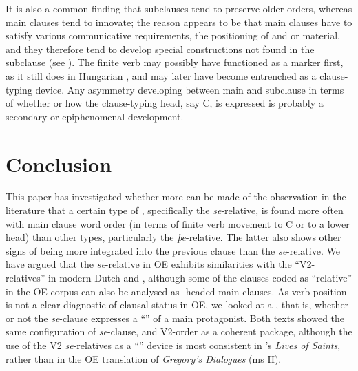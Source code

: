 \documentclass[output=paper,colorlinks,citecolor=brown]{langscibook}
\begin{document}
It is also a common finding that subclauses tend to preserve older orders, whereas main clauses tend to innovate; the reason appears to be that main clauses have to satisfy various communicative requirements, the positioning of  and  or  material, and they therefore tend to develop special constructions not found in the subclause (see \citealt{Bybee2001}). The finite verb may possibly have functioned as a  marker first, as it still does in Hungarian \citep[63]{Comrie1997}, and may later have become entrenched as a clause-typing device. Any asymmetry developing between main and subclause in terms of whether or how the clause-typing head, say C, is expressed is probably a secondary or epiphenomenal development.


\section{Conclusion}\label{sec:los:7}

This paper has investigated whether more can be made of the observation in the literature that a certain type of , specifically the \textit{se}{}-relative, is found more often with main clause word order (in terms of finite verb movement to C or to a lower head) than other types, particularly the \textit{þe}{}-relative. The latter also shows other signs of being more integrated into the previous clause than the \textit{se}{}-relative. We have argued that the \textit{se}{}-relative in OE exhibits similarities with the “V2-relatives” in modern Dutch and , although some of the clauses coded as “relative” in the OE corpus can also be analysed as -headed main clauses. As verb position is not a clear diagnostic of clausal status in OE, we looked at a , that is, whether or not the \textit{se}{}-clause expresses a “” of a main protagonist. Both texts showed the same configuration of \textit{se}-clause,  and V2-order as a coherent package, although the use of the V2 \textit{se}{}-relatives as a “” device is most consistent in 's \textit{Lives of Saints}, rather than in the OE translation of \textit{Gregory's Dialogues} (ms H).
\end{document}
